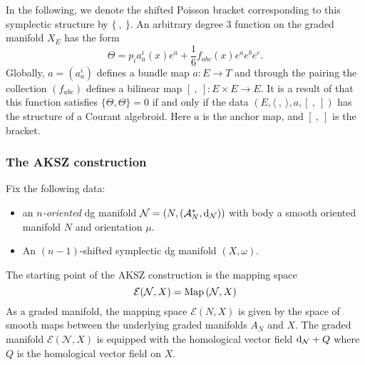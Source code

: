 \documentclass[letterpaper,12pt]{article}
\newcommand{\cE}{\mathcal{E}}
\newcommand{\cN}{\mathcal{N}}
\newcommand{\sA}{\mathcal{A}}
\def\d{{\rm d}}
\newcommand{\la}{\langle}
\newcommand{\ra}{\rangle}
\newcommand{\lara}{\la\ ,\ \ra}
\newcommand{\brac}{[\ ,\ ]}
\theoremstyle{definition}
\theoremstyle{remark}
\theoremstyle{examples}
\def\brian{\textcolor{blue}{BM: }\textcolor{blue}}
\begin{document}
In the following, we denote the shifted Poisson bracket corresponding to this symplectic structure by $\{\ ,\ \}$. 
An arbitrary degree $3$ function on the graded manifold $X_E$ has the form
\[
\Theta = p_i a_a^i (x) e^a + \frac{1}{6} f_{abc} (x) e^a e^b e^c .
\]
Globally, $a = (a_a^i)$ defines a bundle map $a : E \to T$ and through the pairing the collection $(f_{abc})$ defines a bilinear map $\brac : E \times E \to E$. 
It is a result of \cite{Roytenberg:2002nu} that this function satisfies $\{\Theta, \Theta\} = 0$ if and only if the data $(E, \lara, a, \brac)$ has the structure of a Courant algebroid. 
Here $a$ is the anchor map, and $\brac$ is the bracket. 

%

\subsubsection{The AKSZ construction}

Fix the following data:
\begin{itemize}
\item an {\em $n$-oriented} dg manifold $\cN = (N, (\sA^*_N, \d_\cN))$ with body a smooth oriented manifold $N$ and orientation $\mu$. 
\item An $(n-1)$-shifted symplectic dg manifold $(X,\omega)$. 
\end{itemize}

The starting point of the AKSZ construction is the mapping space
\begin{equation}\label{eqn: map}
\cE (\cN, X) = {\rm Map}\left(\cN, X\right)
\end{equation}
As a graded manifold, the mapping space $\cE(N,X)$ is given by the space of smooth maps between the underlying graded manifolds $A_N$ and $X$. 
The graded manifold $\cE(\cN, X)$ is equipped with the homological vector field $\d_\cN + Q$ where $Q$ is the homological vector field on $X$. 
\end{document}
